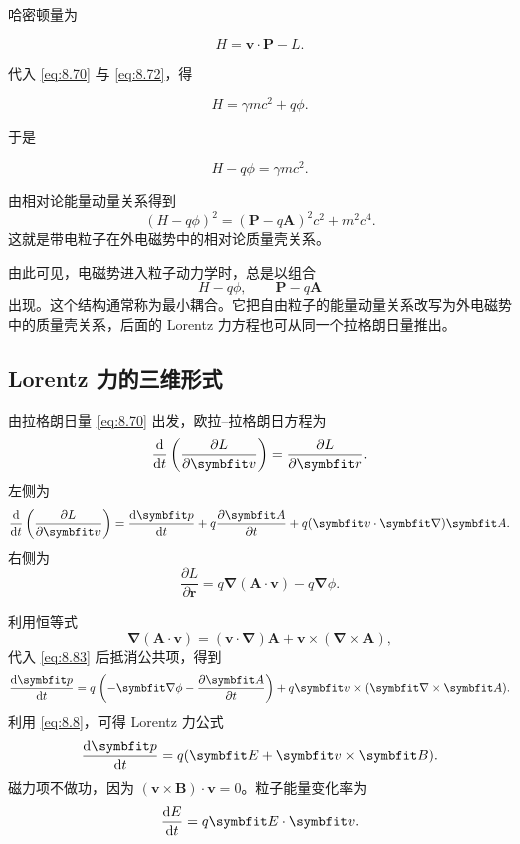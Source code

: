 哈密顿量为

\[
H=\bm{v}\cdot\bm{P}-L.
\]

代入 \eqref{eq:8.70} 与 \eqref{eq:8.72}，得

\[
H=\gamma mc^{2}+q\phi.
\]

于是

\[
H-q\phi=\gamma mc^{2}.
\]

由相对论能量动量关系得到
\begin{equation}
	(H-q\phi)^{2}
	=
	(\bm{P}-q\bm{A})^{2}c^{2}+m^{2}c^{4}.
	\label{eq:8.78}
\end{equation}
这就是带电粒子在外电磁势中的相对论质量壳关系。


由此可见，电磁势进入粒子动力学时，总是以组合
\[
H-q\phi,
\qquad
\bm{P}-q\bm{A}
\]
出现。这个结构通常称为最小耦合。它把自由粒子的能量动量关系改写为外电磁势中的质量壳关系，后面的 Lorentz 力方程也可从同一个拉格朗日量推出。

\subsection{Lorentz 力的三维形式}

由拉格朗日量 \eqref{eq:8.70} 出发，欧拉--拉格朗日方程为
\begin{equation}
	\frac{\dif}{\dif t}
	\left(
	\frac{\partial L}{\partial\bm{v}}
	\right)
	=
	\frac{\partial L}{\partial\bm{r}}.
	\label{eq:8.83}
\end{equation}
左侧为
\[
\frac{\dif}{\dif t}
\left(
\frac{\partial L}{\partial\bm{v}}
\right)
=
\frac{\dif\bm{p}}{\dif t}
+
q\frac{\partial\bm{A}}{\partial t}
+
q(\bm{v}\cdot\bm{\nabla})\bm{A}.
\]
右侧为
\[
\frac{\partial L}{\partial\bm{r}}
=
q\bm{\nabla}(\bm{A}\cdot\bm{v})
-
q\bm{\nabla}\phi.
\]

利用恒等式
\[
\bm{\nabla}(\bm{A}\cdot\bm{v})
=
(\bm{v}\cdot\bm{\nabla})\bm{A}
+
\bm{v}\times(\bm{\nabla}\times\bm{A}),
\]
代入 \eqref{eq:8.83} 后抵消公共项，得到
\[
\frac{\dif\bm{p}}{\dif t}
=
q\left(
-\bm{\nabla}\phi
-
\frac{\partial\bm{A}}{\partial t}
\right)
+
q\bm{v}\times(\bm{\nabla}\times\bm{A}).
\]
利用 \eqref{eq:8.8}，可得 Lorentz 力公式
\begin{equation}
	\frac{\dif\bm{p}}{\dif t}
	=
	q(\bm{E}+\bm{v}\times\bm{B}).
	\label{eq:8.88}
\end{equation}
磁力项不做功，因为 $(\bm{v}\times\bm{B})\cdot\bm{v}=0$。粒子能量变化率为
\begin{equation}
	\frac{\dif E}{\dif t}=q\bm{E}\cdot\bm{v}.
	\label{eq:8.89}
\end{equation}

